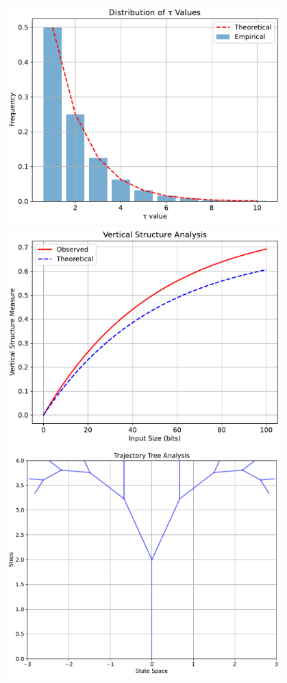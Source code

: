 \documentclass[12pt]{article}
\begin{document}
\includegraphics[width=0.8\textwidth]{tau_distribution.pdf}
\includegraphics[width=0.8\textwidth]{vertical_structure.pdf}
\includegraphics[width=0.8\textwidth]{trajectory_tree.pdf}
\end{document}
